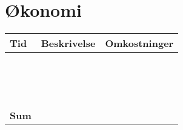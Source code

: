 \documentclass[a4paper,11pt,notitlepage,landscape]{report}
\begin{document}
\section*{Økonomi}

\begin{tabularx}{\textwidth-1cm}{|p{3cm}|X|p{3cm}|} \hline
Tid & Beskrivelse & Omkostninger \\\hline
& & \\\hline
& & \\\hline
& & \\\hline
& & \\\hline
& & \\\hline
& & \\\hline
& & \\\hline
& & \\\hline
& & \\\hline
& & \\\hline
& & \\\hline
& & \\\hline
& & \\\hline
& & \\\hline
& & \\\hline
{\bf Sum} & & \\\hline
\end{tabularx}
\end{document}
